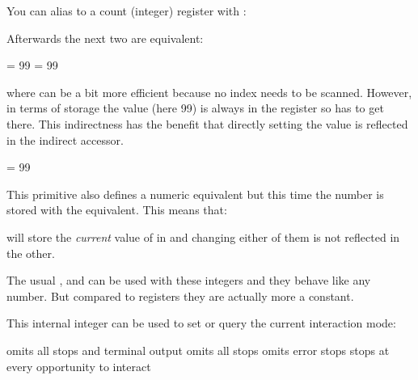 \startnewprimitive[title={\prm {integerdef}}]

You can alias to a count (integer) register with :

\starttyping
\countdef{}
\stoptyping

Afterwards the next two are equivalent:

\starttyping
\MyCount   = 99
 = 99
\stoptyping

where \type {\MyCount} can be a bit more efficient because no index needs to be
scanned. However, in terms of storage the value (here 99) is always in the register
so \type {\MyCount} has to get there. This indirectness has the benefit that directly
setting the value is reflected in the indirect accessor.

\starttyping
\integerdef\MyCount = 99
\stoptyping

This primitive also defines a numeric equivalent but this time the number is stored
with the equivalent. This means that:

\starttyping
\let\MyCopyOfCount = \MyCount
\stoptyping

will store the {\em current} value of \type {\MyCount} in \type {\MyCopyOfCount} and
changing either of them is not reflected in the other.

The usual ,  and  can be used with these
integers and they behave like any number. But compared to registers they are actually
more a constant.

\stopnewprimitive

\startoldprimitive[title={\prm {interactionmode}}]

This internal integer can be used to set or query the current interaction mode:

\starttabulate[||||]
\NC \type {\batchmode    } \NC \the\batchmodecode     \NC omits all stops and terminal output \NC \NR
\NC \type {\nonstopmode  } \NC \the\nonstopmodecode   \NC omits all stops \NC \NR
\NC \type {\scrollmode   } \NC \the\scrollmodecode    \NC omits error stops \NC \NR
\NC \type {\errorstopmode} \NC \the\errorstopmodecode \NC stops at every opportunity to interact \NC \NR
\stoptabulate

%

